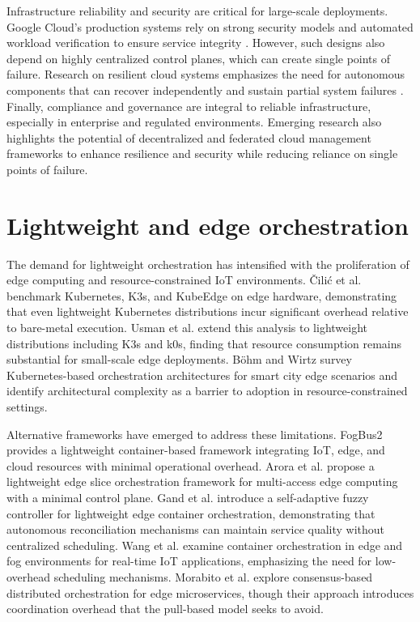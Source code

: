 Infrastructure reliability and security are critical for large-scale deployments. Google Cloud’s production systems rely on strong security models and automated workload verification to ensure service integrity \cite{google_security}. However, such designs also depend on highly centralized control planes, which can create single points of failure. Research on resilient cloud systems emphasizes the need for autonomous components that can recover independently \cite{liaqat2017federated} and sustain partial system failures \cite{velev2011cloud, rasheed2014data}. Finally, compliance and governance are integral to reliable infrastructure, especially in enterprise and regulated environments. Emerging research also highlights the potential of decentralized and federated cloud management frameworks to enhance resilience and security while reducing reliance on single points of failure.

\section{Lightweight and edge orchestration}

The demand for lightweight orchestration has intensified with the proliferation of edge computing and resource-constrained IoT environments. Čilić et al. \cite{cilic2023edgeeval} benchmark Kubernetes, K3s, and KubeEdge on edge hardware, demonstrating that even lightweight Kubernetes distributions incur significant overhead relative to bare-metal execution. Usman et al. \cite{usman2024lightweight} extend this analysis to lightweight distributions including K3s and k0s, finding that resource consumption remains substantial for small-scale edge deployments. Böhm and Wirtz \cite{bohm2022cloudedge} survey Kubernetes-based orchestration architectures for smart city edge scenarios and identify architectural complexity as a barrier to adoption in resource-constrained settings.

Alternative frameworks have emerged to address these limitations. FogBus2 \cite{deng2021fogbus2} provides a lightweight container-based framework integrating IoT, edge, and cloud resources with minimal operational overhead. Arora et al. \cite{arora2022leso} propose a lightweight edge slice orchestration framework for multi-access edge computing with a minimal control plane. Gand et al. \cite{gand2020fuzzy} introduce a self-adaptive fuzzy controller for lightweight edge container orchestration, demonstrating that autonomous reconciliation mechanisms can maintain service quality without centralized scheduling. Wang et al. \cite{wang2022edgefog} examine container orchestration in edge and fog environments for real-time IoT applications, emphasizing the need for low-overhead scheduling mechanisms. Morabito et al. \cite{morabito2025consensus} explore consensus-based distributed orchestration for edge microservices, though their approach introduces coordination overhead that the pull-based model seeks to avoid.

